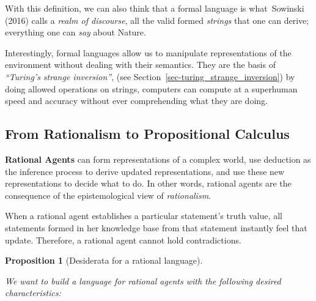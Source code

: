 \documentclass[
  letterpaper,
  12pt,
  british]{tufte-book}
\theoremstyle{plain}
\theoremstyle{plain}
\newtheorem{proposition}{Proposition}[chapter]
\theoremstyle{definition}
\theoremstyle{remark}
\begin{document}
With this definition, we can also think that a formal language is
what~Sowinski
(2016)
calls a \emph{realm of discourse}, all the valid formed
\emph{strings} that
one can derive; everything one can \emph{say} about Nature.

Interestingly, formal languages allow us to manipulate representations
of the environment without dealing with their semantics. They are the
basis of \emph{``Turing's strange inversion''}, (see
Section~\ref{sec-turing_strange_inversion}) by doing allowed operations
on strings, computers can compute at a superhuman speed and accuracy
without ever comprehending what they are doing.

\hypertarget{sec-from_rationalism}{%
\subsection{From Rationalism to Propositional
Calculus}\label{sec-from_rationalism}}

\textbf{Rational Agents} can form representations of a complex world,
use deduction as the inference process to derive updated
representations, and use these new representations to decide what to do.
In other words, rational agents are the consequence of the
epistemological view of \emph{rationalism}.

When a rational agent establishes a particular statement's truth value,
all statements formed in her knowledge base from that statement
instantly feel that update. Therefore, a rational agent cannot hold
contradictions.

\leavevmode{}%
\begin{proposition}[Desiderata for a rational
language]\label{prp-desiderata_language}

We want to build a language for rational agents with the following
desired characteristics:

\end{proposition}
\end{document}
